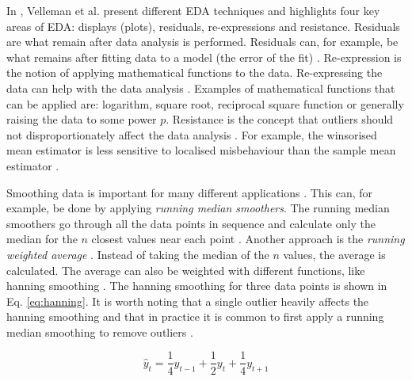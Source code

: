 In \cite{Velleman1981}, Velleman et al. present different EDA techniques and highlights four key areas of EDA: displays (plots), residuals, re-expressions and resistance.
Residuals are what remain after data analysis is performed.
Residuals can, for example, be what remains after fitting data to a model (the error of the fit) \cite{Velleman1981}.
Re-expression is the notion of applying mathematical functions to the data.
Re-expressing the data can help with the data analysis \cite{Hoaglin2003, Velleman1981}.
Examples of mathematical functions that can be applied are: logarithm, square root, reciprocal square function or generally raising the data to some power $p$.
Resistance is the concept that outliers should not disproportionately affect the data analysis \cite{Hoaglin2003, Velleman1981}.
For example, the winsorised mean estimator is less sensitive to localised misbehaviour than the sample mean estimator \cite{Tukey1977}.

Smoothing data is important for many different applications \cite{Bradley1997, Pang2002, Quinlan1992, Velleman1981}.
This can, for example, be done by applying \emph{running median smoothers}.
The running median smoothers go through all the data points in sequence and calculate only the median for the $n$ closest values near each point \cite{Velleman1981}.
Another approach is the \emph{running weighted average} \cite{Velleman1981}.
Instead of taking the median of the $n$ values, the average is calculated.
The average can also be weighted with different functions, like hanning smoothing \cite{Velleman1981}.
The hanning smoothing for three data points is shown in Eq. \ref{eq:hanning}.
It is worth noting that a single outlier heavily affects the hanning smoothing and that in practice it is common to first apply a running median smoothing to remove outliers \cite{Velleman1981}.

\begin{equation}
    \hat y_t = \frac{1}{4} y_{t-1} + \frac{1}{2} y_t + \frac{1}{4} y_{t + 1} 
    \label{eq:hanning}
\end{equation}